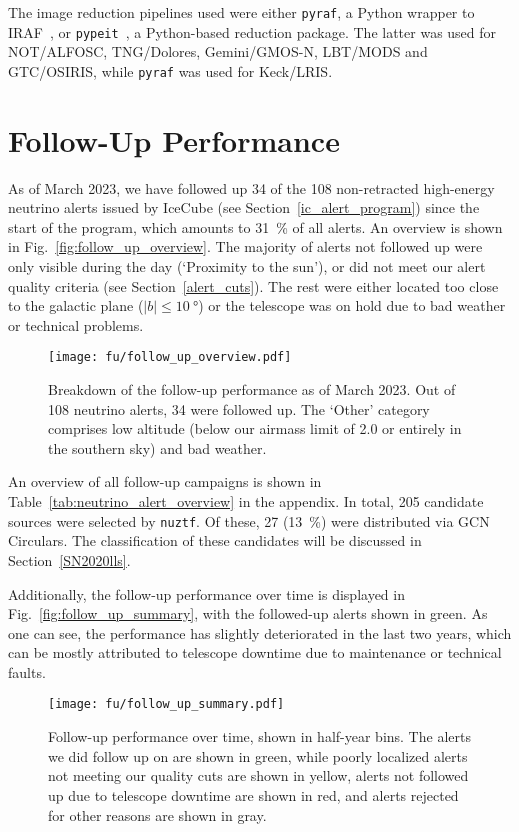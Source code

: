 The image reduction pipelines used were either \texttt{pyraf}, a Python wrapper to IRAF~, or \texttt{pypeit}~, a Python-based reduction package. The latter was used for NOT/ALFOSC, TNG/Dolores, Gemini/GMOS-N, LBT/MODS and GTC/OSIRIS, while \texttt{pyraf} was used for Keck/LRIS.

\section{Follow-Up Performance}
As of March 2023, we have followed up 34 of the 108 non-retracted high-energy neutrino alerts issued by IceCube (see Section~\ref{ic_alert_program}) since the start of the program, which amounts to \SI{31}{\percent} of all alerts. An overview is shown in Fig.~\ref{fig:follow_up_overview}. The majority of alerts not followed up were only visible during the day (`Proximity to the sun'), or did not meet our alert quality criteria (see Section~\ref{alert_cuts}). The rest were either located too close to the galactic plane ($|b|\leq\SI{10}{\degree}$) or the telescope was on hold due to bad weather or technical problems.

\begin{figure}[h!]
    \texttt{[image: fu/follow\_up\_overview.pdf]}
    \caption[Follow-up performance]{Breakdown of the follow-up performance as of March 2023. Out of 108 neutrino alerts, 34 were followed up. The `Other' category comprises low altitude (below our airmass limit of 2.0 or entirely in the southern sky) and bad weather.}
\end{figure}

An overview of all follow-up campaigns is shown in Table~\ref{tab:neutrino_alert_overview} in the appendix.
In total, 205 candidate sources were selected by \texttt{nuztf}. Of these, 27 (\SI{13}{\percent}) were distributed via GCN Circulars. The classification of these candidates will be discussed in Section~\ref{SN2020lls}.

Additionally, the follow-up performance over time is displayed in Fig.~\ref{fig:follow_up_summary}, with the followed-up alerts shown in green. As one can see, the performance has slightly deteriorated in the last two years, which can be mostly attributed to telescope downtime due to maintenance or technical faults.

\begin{figure}[h!]
    \texttt{[image: fu/follow\_up\_summary.pdf]}
    \caption[Follow-up performance over time]{Follow-up performance over time, shown in half-year bins. The alerts we did follow up on are shown in green, while poorly localized alerts not meeting our quality cuts are shown in yellow, alerts not followed up due to telescope downtime are shown in red, and alerts rejected for other reasons are shown in gray.}
\end{figure}

